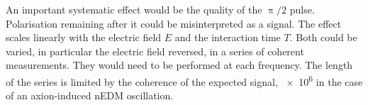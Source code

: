 An important systematic effect would be the quality of the $\uppi/2$ pulse. Polarisation remaining after it could be misinterpreted as a signal. The effect scales linearly with the electric field $E$ and the interaction time $T$. Both could be varied, in particular the electric field reversed, in a series of coherent measurements. They would need to be performed at each frequency. The length of the series is limited by the coherence of the expected signal, \num{e6} in the case of an axion-induced nEDM oscillation.
